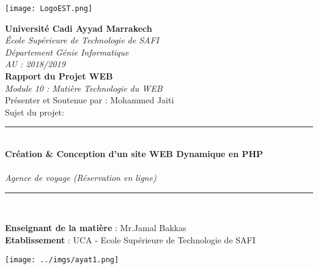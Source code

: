 \documentclass[a4paper,12pt]{report}
\begin{document}
\newpage
\thispagestyle{empty} 
\begin{center}
\texttt{[image: LogoEST.png]}
\end{center}
\begin{center}
\Large \textbf{Université Cadi Ayyad Marrakech}  \\
\textit{École Supérieure de Technologie de SAFI}  \\
\textit{Département Génie Informatique \\ AU : 2018/2019} \\ \vfill
\Huge \textbf{Rapport du Projet WEB} \normalsize\\ \vfill
\textit{Module 10 : Matière Technologie du WEB}  \\ \vfill Présenter et Soutenue par : Mohammed Jaiti  \\ \vfill 
Sujet du projet: \\ 
\rule{0.75\textwidth}{2pt}\vspace{0.9\baselineskip} \\
\Large {{ \textbf{Création \& Conception d'un site WEB Dynamique en PHP} }}\normalsize \\
\quad
\\
\Large \textit{Agence de voyage (Réservation en ligne) } \normalsize\vspace{0.5\baselineskip} \\
\rule{0.75\textwidth}{2pt} \\ 
\end{center}
\vfill
\textbf{Enseignant de la matière} : Mr.Jamal Bakkas \\ 
\textbf{Etablissement } : UCA - Ecole Supérieure de  Technologie de SAFI \\
\newpage
\thispagestyle{empty} 
\vfill
\vfill
\newpage
\thispagestyle{empty}
\hspace*{0mm}\vfill
\begin{center}
\texttt{[image: ../imgs/ayat1.png]} 
\end{center}
\vfill\hspace*{0mm}
\end{document}
